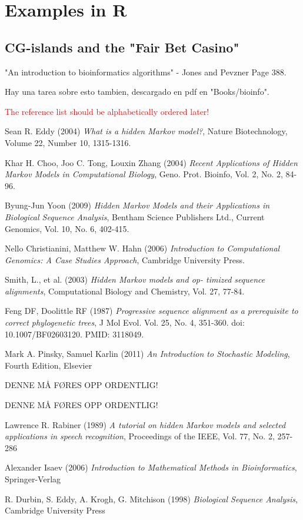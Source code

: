 \documentclass{article}
\begin{document}
\section{Examples in R}

\subsection{CG-islands and the "Fair Bet Casino"}

"An introduction to bioinformatics algorithms" - Jones and Pevzner Page 388. 

Hay una tarea sobre esto tambien, descargado en pdf en "Books/bioinfo".

\textcolor{red}{The reference list should be alphabetically ordered later!}
\begin{thebibliography}{20}
Sean R. Eddy (2004) \emph{What is a hidden Markov model?}, Nature Biotechnology, Volume 22, Number 10, 1315-1316.

Khar H. Choo, Joo C. Tong, Louxin Zhang (2004) \emph{Recent Applications of Hidden Markov Models in Computational Biology}, Geno. Prot. Bioinfo, Vol. 2, No. 2, 84-96.

Byung-Jun Yoon (2009) \emph{Hidden Markov Models and their Applications in Biological Sequence Analysis}, Bentham Science Publishers Ltd., Current Genomics, Vol. 10, No. 6, 402-415.

Nello Christianini, Matthew W. Hahn (2006) \emph{Introduction to Computational Genomics: A Case Studies Approach}, Cambridge University Press.

Smith, L., et al. (2003) \emph{Hidden Markov models and op-
timized sequence alignments}, Computational Biology and Chemistry, Vol. 27, 77-84.

Feng DF, Doolittle RF (1987) \emph{Progressive sequence alignment as a prerequisite to correct phylogenetic trees}, J Mol Evol. Vol. 25, No. 4, 351-360. doi: 10.1007/BF02603120. PMID: 3118049.

Mark A. Pinsky, Samuel Karlin (2011) \emph{An Introduction to Stochastic Modeling}, Fourth Edition, Elsevier

DENNE MÅ FØRES OPP ORDENTLIG!

DENNE MÅ FØRES OPP ORDENTLIG!

Lawrence R. Rabiner (1989) \emph{A tutorial on hidden Markov models and selected applications in speech recognition}, Proceedings of the IEEE, Vol. 77, No. 2, 257-286

Alexander Isaev (2006) \emph{Introduction to Mathematical Methods in Bioinformatics}, Springer-Verlag

R. Durbin, S. Eddy, A. Krogh, G. Mitchison (1998) \emph{Biological Sequence Analysis}, Cambridge University Press

\end{thebibliography}
\end{document}
